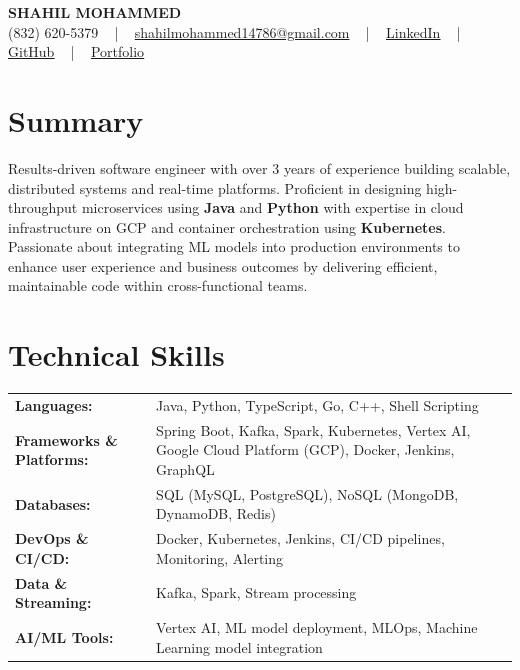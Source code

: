 \documentclass[letterpaper,11pt]{article}
\begin{document}
\begin{center}
    {\fontsize{14pt}{12pt}\selectfont \textbf{\MakeUppercase{Shahil Mohammed}}}\\ \vspace{2pt}
    \fontsize{10pt}{12pt}\selectfont (832) 620-5379 ~ | ~ \href{mailto:shahilmohammed14786@gmail.com}{shahilmohammed14786@gmail.com} ~ | ~  
    \href{https://www.linkedin.com/in/shahil-mohammed-9652931a1/}{\color{blue}\underline{LinkedIn}}  ~ | ~ 
    \href{https://github.com/freakbeast14}{\color{blue}\underline{GitHub}} ~ | ~ 
    \href{https://shahil-mohammed.netlify.app/}{\color{blue}\underline{Portfolio}}
    \vspace{-8pt}
\end{center}

\section{Summary}
\fontsize{9pt}{10pt}\selectfont
Results-driven software engineer with over 3 years of experience building scalable, distributed systems and real-time platforms. Proficient in designing high-throughput microservices using \textbf{Java} and \textbf{Python} with expertise in cloud infrastructure on GCP and container orchestration using \textbf{Kubernetes}. Passionate about integrating ML models into production environments to enhance user experience and business outcomes by delivering efficient, maintainable code within cross-functional teams.  
 \vspace{-5pt}
 
\section{Technical Skills}
        \vspace{-14pt}
        \begin{table}[h]
            \fontsize{9pt}{10pt}\selectfont
            \begin{tabular}{p{0.28\linewidth} p{0.72\linewidth}}
                \textbf{Languages:} & Java, Python, TypeScript, Go, C++, Shell Scripting \\
                \textbf{Frameworks \& Platforms:} & Spring Boot, Kafka, Spark, Kubernetes, Vertex AI, Google Cloud Platform (GCP), Docker, Jenkins, GraphQL \\
                \textbf{Databases:} & SQL (MySQL, PostgreSQL), NoSQL (MongoDB, DynamoDB, Redis) \\
                \textbf{DevOps \& CI/CD:} & Docker, Kubernetes, Jenkins, CI/CD pipelines, Monitoring, Alerting \\
                \textbf{Data \& Streaming:} & Kafka, Spark, Stream processing \\
                \textbf{AI/ML Tools:} & Vertex AI, ML model deployment, MLOps, Machine Learning model integration \\
            \end{tabular}
        \end{table}
 \vspace{-15pt}
 
\end{document}
